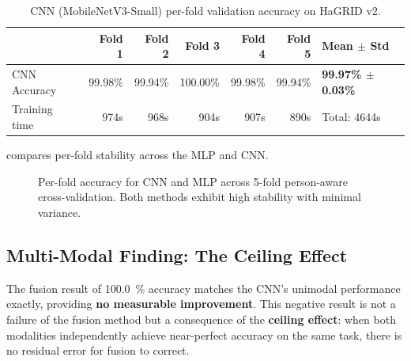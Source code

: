\documentclass[11pt,a4paper]{article}
\begin{document}
\begin{table}[htbp]
\centering
\caption{CNN (MobileNetV3-Small) per-fold validation accuracy on HaGRID v2.}
\label{tab:cnn_folds}
\begin{tabular}{@{}lrrrrrl@{}}
\toprule
& \textbf{Fold 1} & \textbf{Fold 2} & \textbf{Fold 3} & \textbf{Fold 4} & \textbf{Fold 5} & \textbf{Mean $\pm$ Std} \\
\midrule
CNN Accuracy & 99.98\% & 99.94\% & 100.00\% & 99.98\% & 99.94\% & \textbf{99.97\% $\pm$ 0.03\%} \\
Training time & 974s & 968s & 904s & 907s & 890s & Total: 4644s \\
\bottomrule
\end{tabular}
\end{table}

 compares per-fold stability across the MLP and CNN.

\begin{figure}[htbp]
\centering
{}
\caption{Per-fold accuracy for CNN and MLP across 5-fold person-aware cross-validation. Both methods exhibit high stability with minimal variance.}
\label{fig:cvstability}
\end{figure}

\subsection{Multi-Modal Finding: The Ceiling Effect}
\label{sec:ceiling}

The fusion result of \SI{100.0}{\percent} accuracy matches the CNN's unimodal performance exactly, providing \textbf{no measurable improvement}. This negative result is not a failure of the fusion method but a consequence of the \textbf{ceiling effect}: when both modalities independently achieve near-perfect accuracy on the same task, there is no residual error for fusion to correct.
\end{document}
